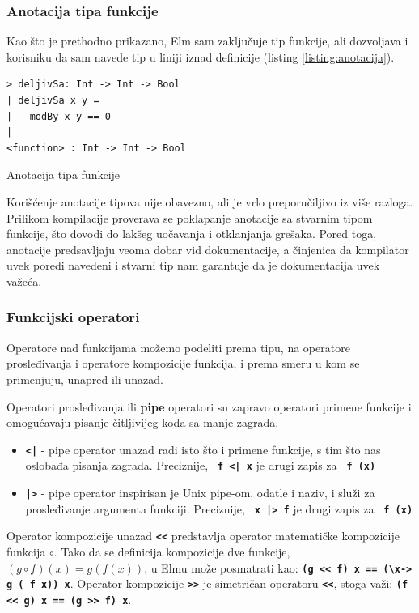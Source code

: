 \documentclass[12pt,oneside]{memoir}
\begin{document}
\subsubsection{Anotacija tipa funkcije}
Kao što je prethodno prikazano, Elm sam zaključuje tip funkcije, ali dozvoljava i korisniku
da sam navede tip u liniji iznad definicije (listing \ref{listing:anotacija}).
\begin{listing}[!h]
\begin{verbatim}
> deljivSa: Int -> Int -> Bool
| deljivSa x y =
|   modBy x y == 0
|
<function> : Int -> Int -> Bool
\end{verbatim}
\caption{Anotacija tipa funkcije}
\label{listing:anotacija}
\end{listing}

Korišćenje anotacije tipova nije obavezno, ali je vrlo preporučiljivo iz više razloga.
Prilikom kompilacije proverava se poklapanje anotacije sa stvarnim tipom funkcije, što
dovodi do lakšeg uočavanja i otklanjanja grešaka. Pored toga, anotacije predsavljaju veoma
dobar vid dokumentacije, a činjenica da kompilator uvek poredi navedeni i stvarni tip nam
garantuje da je dokumentacija uvek važeća.

\subsubsection{Funkcijski operatori}
Operatore nad funkcijama možemo podeliti prema tipu, na operatore prosleđivanja i operatore
kompozicije funkcija, i prema smeru u kom se primenjuju, unapred ili unazad.

Operatori prosleđivanja ili \textbf{pipe} operatori su zapravo operatori primene funkcije
i omogućavaju pisanje čitljivijeg koda sa manje zagrada.
\begin{itemize}
  \item \texttt{\textbf{<|}} - pipe operator unazad radi isto što i primene funkcije, 
  s tim što nas oslobađa pisanja zagrada. Preciznije, \texttt{\textbf{ f <| x}} je drugi zapis
  za \texttt{\textbf{ f (x)}}
  \item \texttt{\textbf{|>}} - pipe operator inspirisan je Unix pipe-om, odatle i
  naziv, i služi za prosleđivanje argumenta funkciji. Preciznije,  \texttt{\textbf{ x |> f}}
  je drugi zapis za \texttt{\textbf{ f (x)}}
\end{itemize}

Operator kompozicije unazad \texttt{\textbf{<\smallskip<}} predstavlja operator matematičke 
kompozicije funkcija \(\circ\). Tako da se definicija kompozicije dve funkcije, \((g \circ f)(x) = g(f(x))\),
u Elmu može posmatrati kao: \texttt{\textbf{(g <\smallskip< f) x == (\textbackslash x\textunderscore ->
g ( f x\textunderscore)) x}}. Operator kompozicije \texttt{\textbf{>\smallskip>}} je
simetričan operatoru \texttt{\textbf{<\smallskip<}}, stoga važi: \texttt{\textbf{(f <\smallskip< g) x == (g >\smallskip> f) x}}.
\end{document}
